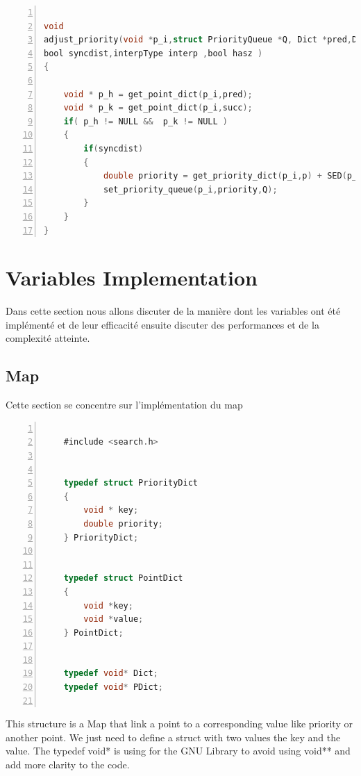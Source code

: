 \documentclass[twoside,12pt, a4paper]{report}
\begin{document}
\begin{lstlisting}[language=C, % Spécifie le langage du code
	caption={adjust\_priority}, % Légende du listing
	label=lst:adjust_c, % Étiquette pour référencer le listing
	numbers=left, 
	numberstyle=\tiny\color{gray}, 
	stepnumber=1, 
	frame=single,
	breaklines=true, 
	postbreak=\mbox{\textcolor{red}{$\hookrightarrow$}\space},
	showstringspaces=false 
	]
	
void
adjust_priority(void *p_i,struct PriorityQueue *Q, Dict *pred,Dict *succ,PDict  *p,
bool syncdist,interpType interp ,bool hasz )
{
	
	void * p_h = get_point_dict(p_i,pred);
	void * p_k = get_point_dict(p_i,succ);
	if( p_h != NULL &&  p_k != NULL )
	{
		if(syncdist)
		{
			double priority = get_priority_dict(p_i,p) + SED(p_h,p_i,p_k, interp , hasz );
			set_priority_queue(p_i,priority,Q);
		}
	}
}	

\end{lstlisting}

\section{Variables Implementation}
Dans cette section nous allons discuter de la manière dont les variables ont été implémenté et de leur efficacité ensuite discuter des performances et de la complexité atteinte. 

\subsection{Map}
Cette section se concentre sur l'implémentation du map

\begin{lstlisting}[language=C, % Spécifie le langage du code
	caption={Map C implementation}, % Légende du listing
	label=lst:map_c, % Étiquette pour référencer le listing
	numbers=left, 
	numberstyle=\tiny\color{gray}, 
	stepnumber=1, 
	frame=single,
	breaklines=true, 
	postbreak=\mbox{\textcolor{red}{$\hookrightarrow$}\space},
	showstringspaces=false 
	]
	
	#include <search.h>
	
	
	typedef struct PriorityDict
	{
		void * key;
		double priority;
	} PriorityDict;
	
	
	typedef struct PointDict
	{
		void *key;
		void *value;
	} PointDict;
	
	
	typedef void* Dict;
	typedef void* PDict;
	
\end{lstlisting}
\vspace{1cm}
This structure is a Map that link a point to a corresponding value like priority or another point. We just need to define a struct with two values the key and the value. The typedef void* is using for the GNU Library to avoid using void** and add more clarity to the code. 
\end{document}
